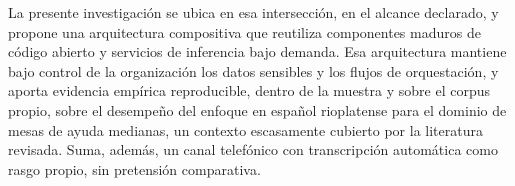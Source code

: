 La presente investigación se ubica en esa intersección, en el alcance declarado, y propone una arquitectura compositiva que reutiliza componentes maduros de código abierto y servicios de inferencia bajo demanda. Esa arquitectura mantiene bajo control de la organización los datos sensibles y los flujos de orquestación, y aporta evidencia empírica reproducible, dentro de la muestra y sobre el corpus propio, sobre el desempeño del enfoque en español rioplatense para el dominio de mesas de ayuda medianas, un contexto escasamente cubierto por la literatura revisada. Suma, además, un canal telefónico con transcripción automática como rasgo propio, sin pretensión comparativa.

\newpage
